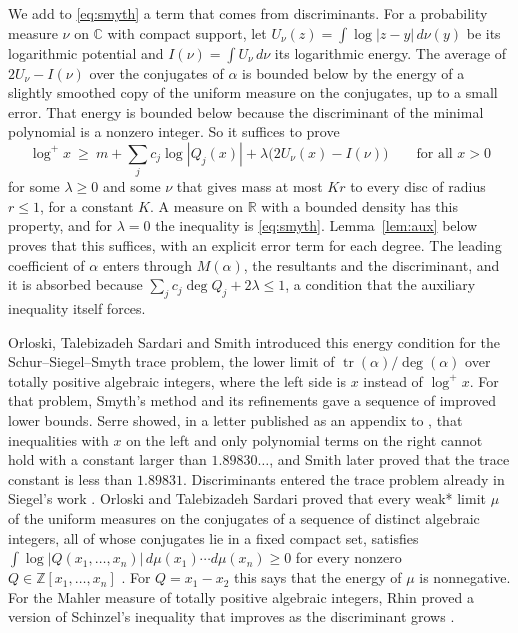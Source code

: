 \documentclass[11pt]{amsart}
\theoremstyle{remark}
\numberwithin{equation}{section}
\newcommand{\R}{\mathbb{R}}
\newcommand{\Z}{\mathbb{Z}}
\newcommand{\C}{\mathbb{C}}
\newcommand{\logp}{\log^{+}}
\newcommand{\tr}{\operatorname{tr}}
\begin{document}
We add to \eqref{eq:smyth} a term that comes from discriminants. For a probability measure $\nu$ on $\C$ with compact support, let $U_\nu(z)=\int\log|z-y|\,d\nu(y)$ be its logarithmic potential and $I(\nu)=\int U_\nu\,d\nu$ its logarithmic energy. The average of $2U_\nu-I(\nu)$ over the conjugates of $\alpha$ is bounded below by the energy of a slightly smoothed copy of the uniform measure on the conjugates, up to a small error. That energy is bounded below because the discriminant of the minimal polynomial is a nonzero integer. So it suffices to prove
\[
\logp x\ \ge\ m+\sum_jc_j\log|Q_j(x)|+\lambda\bigl(2U_\nu(x)-I(\nu)\bigr)\qquad\text{for all }x>0
\]
for some $\lambda\ge0$ and some $\nu$ that gives mass at most $Kr$ to every disc of radius $r\le1$, for a constant $K$. A measure on $\R$ with a bounded density has this property, and for $\lambda=0$ the inequality is \eqref{eq:smyth}. Lemma~\ref{lem:aux} below proves that this suffices, with an explicit error term for each degree. The leading coefficient of $\alpha$ enters through $M(\alpha)$, the resultants and the discriminant, and it is absorbed because $\sum_jc_j\deg Q_j+2\lambda\le1$, a condition that the auxiliary inequality itself forces.

Orloski, Talebizadeh Sardari and Smith \cite{OSS25} introduced this energy condition for the Schur--Siegel--Smyth trace problem, the lower limit of $\tr(\alpha)/\deg(\alpha)$ over totally positive algebraic integers, where the left side is $x$ instead of $\logp x$. For that problem, Smyth's method \cite{Smy84} and its refinements gave a sequence of improved lower bounds. Serre showed, in a letter published as an appendix to \cite{AP08}, that inequalities with $x$ on the left and only polynomial terms on the right cannot hold with a constant larger than $1.89830\ldots$, and Smith \cite{Smi24} later proved that the trace constant is less than $1.89831$. Discriminants entered the trace problem already in Siegel's work \cite{Sie45}. Orloski and Talebizadeh Sardari \cite{OT23} proved that every weak* limit $\mu$ of the uniform measures on the conjugates of a sequence of distinct algebraic integers, all of whose conjugates lie in a fixed compact set, satisfies $\int\log|Q(x_1,\dots,x_n)|\,d\mu(x_1)\cdots d\mu(x_n)\ge0$ for every nonzero $Q\in\Z[x_1,\dots,x_n]$ \cite[Section~1.1]{OSS25}. For $Q=x_1-x_2$ this says that the energy of $\mu$ is nonnegative. For the Mahler measure of totally positive algebraic integers, Rhin \cite{Rhi04} proved a version of Schinzel's inequality that improves as the discriminant grows \cite[Section~9.2]{Smy08}.
\end{document}
